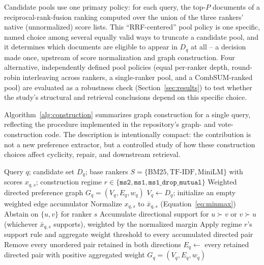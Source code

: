 \documentclass[pdflatex,sn-basic,Numbered]{sn-jnl}
\begin{document}
Candidate pools use one primary policy: for each query, the top-$P$
documents of a reciprocal-rank-fusion ranking computed over the union of
the three rankers' native (unnormalized) score lists. This ``RRF-centered''
pool policy is one specific, named choice among several equally valid
ways to truncate a candidate pool, and it determines which documents are
eligible to appear in $D_q$ at all -- a decision made once, upstream of
score normalization and graph construction. Four alternative,
independently defined pool policies (equal per-ranker depth, round-robin
interleaving across rankers, a single-ranker pool, and a CombSUM-ranked
pool) are evaluated as a robustness check (Section~\ref{sec:results}) to
test whether the study's structural and retrieval conclusions depend on
this specific choice.

Algorithm~\ref{alg:construction} summarizes graph construction for a single
query, reflecting the procedure implemented in the repository's graph- and
vote-construction code. The description is intentionally compact: the
contribution is not a new preference extractor, but a controlled study of
how these construction choices affect cyclicity, repair, and downstream
retrieval.

\begin{algorithm}[t]
\caption{Preference-graph construction for one query}
\label{alg:construction}
\begin{algorithmic}[1]
\Require Query $q$; candidate set $D_q$; base rankers $S=\{\mathrm{BM25},
  \mathrm{TF\text{-}IDF}, \mathrm{MiniLM}\}$ with scores $x_{q,s}$;
  construction regime $r \in \{\texttt{ms2}, \texttt{ms1},
  \texttt{ms1\_drop\_mutual}\}$
\Ensure Weighted directed preference graph $G_q=(V_q,E_q,w_q)$
\State $V_q \gets D_q$; initialize an empty weighted edge accumulator
  \State Normalize $x_{q,s}$ to $\bar{x}_{q,s}$ (Equation~\eqref{eq:minmax})
      \State Abstain on $\{u,v\}$ for ranker $s$
    \Else
      \State Accumulate directional support for $u \succ v$ or $v \succ u$
        (whichever $\bar{x}_{q,s}$ supports), weighted by the normalized
        margin
    \EndIf
  \EndFor
\EndFor
\State Apply regime $r$'s support rule and aggregate weight threshold to
  every accumulated directed pair
  \State Remove every unordered pair retained in both directions
\EndIf
\State $E_q \gets$ every retained directed pair with positive aggregated weight
\State \Return $G_q = (V_q, E_q, w_q)$
\end{algorithmic}
\end{algorithm}
\end{document}
